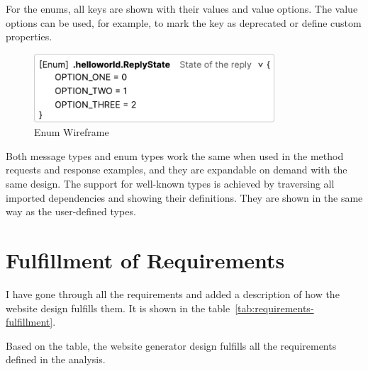 For the enums, all keys are shown with their values and value options.
The value options can be used, for example, to mark the key as deprecated or define custom properties.

\begin{figure}[hbt!]
    \centering
    \captionsetup{justification=centering}
    \includegraphics[width=0.8\textwidth]{images/design/wireframes/enum}
    \caption{Enum Wireframe}
    \label{fig:wireframe-enum}
\end{figure}

Both message types and enum types work the same when used in the method requests and response examples, and they are expandable on demand with the same design.
The support for well-known types is achieved by traversing all imported dependencies and showing their definitions.
They are shown in the same way as the user-defined types.


\section{Fulfillment of Requirements}
I have gone through all the requirements and added a description of how the website design fulfills them.
It is shown in the table~\ref{tab:requirements-fulfillment}.

Based on the table, the website generator design fulfills all the requirements defined in the analysis.

